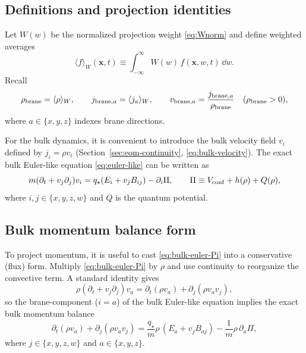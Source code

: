 \documentclass[11pt]{article}
\newcommand{\qstar}{q_\star}
\begin{document}
\subsection{Definitions and projection identities}
\label{app:momentum-defs}

Let $W(w)$ be the normalized projection weight \eqref{eq:Wnorm} and define weighted averages
\begin{equation}
\langle f\rangle_W(\mathbf{x},t)\equiv \int_{-\infty}^{\infty}W(w)\,f(\mathbf{x},w,t)\,\dd w.
\end{equation}
Recall
\begin{equation}
\rho_{\rm brane}=\langle \rho\rangle_W,
\qquad
j_{{\rm brane},a}=\langle j_a\rangle_W,
\qquad
v_{{\rm brane},a} = \frac{j_{{\rm brane},a}}{\rho_{\rm brane}}
\quad (\rho_{\rm brane}>0),
\end{equation}
where $a\in\{x,y,z\}$ indexes brane directions.

For the bulk dynamics, it is convenient to introduce the bulk velocity field $v_i$ defined by $j_i=\rho v_i$ (Section~\ref{sec:eom-continuity}, \eqref{eq:bulk-velocity}). The exact bulk Euler-like equation \eqref{eq:euler-like} can be written as
\begin{equation}
m(\partial_t+v_j\partial_j)v_i
=
\qstar(E_i+v_j B_{ij})
-\partial_i\Pi,
\qquad
\Pi \equiv V_{\rm conf}+h(\rho)+Q(\rho),
\label{eq:bulk-euler-Pi}
\end{equation}
where $i,j\in\{x,y,z,w\}$ and $Q$ is the quantum potential.

\subsection{Bulk momentum balance form}
\label{app:momentum-bulkbalance}

To project momentum, it is useful to cast \eqref{eq:bulk-euler-Pi} into a conservative (flux) form. Multiply \eqref{eq:bulk-euler-Pi} by $\rho$ and use continuity to reorganize the convective term. A standard identity gives
\begin{equation}
\rho(\partial_t+v_j\partial_j)v_a
=
\partial_t(\rho v_a) + \partial_j(\rho v_a v_j),
\end{equation}
so the brane-component ($i=a$) of the bulk Euler-like equation implies the exact bulk momentum balance
\begin{equation}
\boxed{
\partial_t(\rho v_a) + \partial_j(\rho v_a v_j)
=
\frac{\qstar}{m}\rho\,(E_a+v_j B_{aj})
-\frac{1}{m}\rho\,\partial_a\Pi,
}
\label{eq:bulk-momentum-balance}
\end{equation}
where $j\in\{x,y,z,w\}$ and $a\in\{x,y,z\}$.
\end{document}
